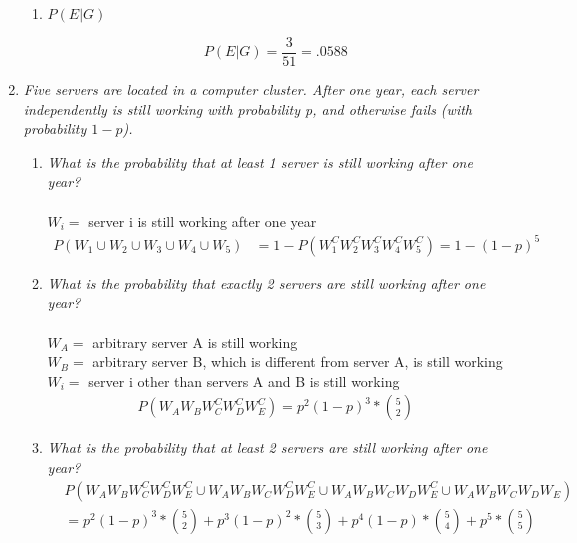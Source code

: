 \documentclass{article} %
\begin{document}
\begin{enumerate}
\begin{enumerate}
		\item $P(E | G)$
		
		$$P(E | G) = \frac{3}{51} = .0588$$
	
	\end{enumerate}
	
	\item \textit{Five servers are located in a computer cluster. After one year, each server independently is still working with probability p, and otherwise fails (with probability $1 - p$).}
	\begin{enumerate}
		\item \textit{What is the probability that at least 1 server is still working after one year?}\\
		\\
		$W_i =$ server i is still working after one year
		\begin{align*}
		P(W_1 \cup W_2 \cup W_3 \cup W_4 \cup W_5) &= 1 - P(W_1^CW_2^CW_3^CW_4^CW_5^C) = 1 - (1 - p)^5
		\end{align*}
		
		\item \textit{What is the probability that exactly 2 servers are still working after one year?}\\
		\\
		$W_A =$ arbitrary server A is still working\\
		$W_B =$ arbitrary server B, which is different from server A, is still working\\
		$W_i =$ server i other than servers A and B is still working
		\begin{align*}
		P(W_AW_BW_C^CW_D^CW_E^C) = p^2(1 - p)^3 * \binom{5}{2}
		\end{align*}
		
		\item \textit{What is the probability that at least 2 servers are still working after one year?}
		\begin{align*}
		&P(W_AW_BW_C^CW_D^CW_E^C \cup W_AW_BW_CW_D^CW_E^C \cup W_AW_BW_CW_DW_E^C \cup W_AW_BW_CW_DW_E)\\
		&= p^2(1 - p)^3 * \binom{5}{2} + p^3(1 - p)^2 * \binom{5}{3} + p^4(1 - p) * \binom{5}{4} + p^5 * \binom{5}{5}
		\end{align*}
	
	\end{enumerate}
	

\end{enumerate}
\end{document}
